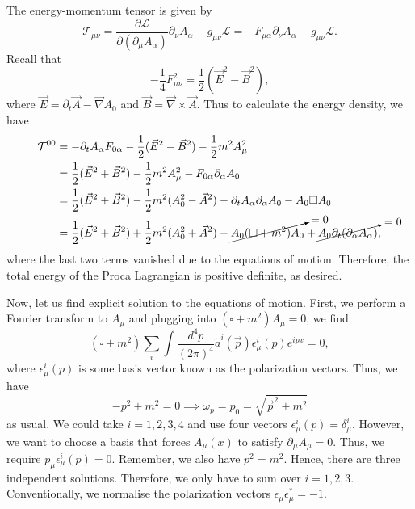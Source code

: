 \documentclass[11pt]{article}
\theoremstyle{definition}
\begin{document}
The energy-momentum tensor is given by
\begin{equation}
    \mathcal{T}_{\mu\nu} = \frac{\partial\mathcal{L}}{\partial(\partial_\mu A_\alpha)}\partial_\nu A_\alpha -g_{\mu\nu}\mathcal{L} =  -F_{\mu\alpha}\partial_\nu A_\alpha - g_{\mu\nu}\mathcal{L}.
\end{equation}
Recall that
\begin{equation}
    -\frac{1}{4}F_{\mu\nu}^2 = \frac{1}{2}(\vec{E}^2-\vec{B}^2),
\end{equation}
where $\vec{E} = \partial_t\vec{A} - \vec{\nabla}A_0$ and $\vec{B} = \vec{\nabla} \times\vec{A}$.
 Thus to calculate the energy density, we have
 \begin{equation}
     \begin{aligned}
         \mathcal{T}^{00} &= -\partial_tA_\alpha F_{0\alpha} - \frac{1}{2}(\vec{E}^2-\vec{B}^2) - \frac{1}{2}m^2A_\mu^2\\
         &= \frac{1}{2}(\vec{E}^2+\vec{B}^2) - \frac{1}{2}m^2A_\mu^2 -F_{0\alpha}\partial_\alpha A_0\\
         &= \frac{1}{2}(\vec{E}^2+\vec{B}^2) - \frac{1}{2}m^2(A_0^2-\vec{A}^2) - \partial_tA_\alpha\partial_\alpha A_0 - A_0\square A_0\\
         &= \frac{1}{2}(\vec{E}^2+\vec{B}^2) + \frac{1}{2}m^2(A_0^2+\vec{A}^2) - \cancelto{=0}{A_0(\square + m^2)A_0} + \cancelto{=0}{A_0\partial_t(\partial_\alpha A_\alpha)},
     \end{aligned}
 \end{equation}
where the last two terms vanished due to the equations of motion. Therefore, the total energy of the Proca Lagrangian is positive definite, as desired.

Now, let us find explicit solution to the equations of motion. First, we perform a Fourier transform to $A_\mu$ and plugging into $(\square+m^2)A_\mu = 0$, we find
\begin{equation}
    (\square+m^2)\sum_i \int \frac{d^4p}{(2\pi)^4}\tilde{a}^i(\vec{p})\epsilon_\mu^i(p)e^{ipx} = 0,
\end{equation}
where $\epsilon_\mu^i(p)$ is some basis vector known as the polarization vectors.
Thus, we have
\begin{equation}
    -p^2 + m^2 = 0 \implies \omega_p = p_0 = \sqrt{\vec{p}^2 + m^2}
\end{equation}
as usual. We could take $i=1,2,3,4$ and use four vectors $\epsilon_\mu^i(p) = \delta^i_\mu$. However, we want to choose a basis that forces $A_\mu(x)$ to satisfy $\partial_\mu A_\mu = 0$. Thus, we require $p_\mu \epsilon_\mu^i(p) = 0$. Remember, we also have $p^2 = m^2$. Hence, there are three independent solutions. Therefore, we only have to sum over $i=1,2,3$. Conventionally, we normalise the polarization vectors $\epsilon_\mu\epsilon_\mu^* = -1$.
\end{document}
